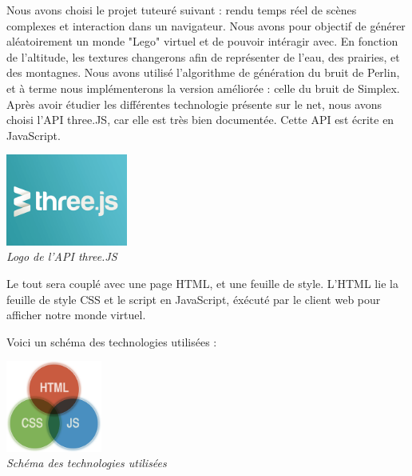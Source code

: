 Nous avons choisi le projet tuteuré suivant : rendu temps réel de scènes complexes et interaction dans un navigateur.
Nous avons pour objectif de générer aléatoirement un monde "Lego" virtuel et de pouvoir intéragir avec. En fonction de
l'altitude, les textures changerons afin de représenter de l'eau, des prairies, et des montagnes. Nous avons utilisé
l'algorithme de génération du bruit de Perlin, et à terme nous implémenterons la version améliorée : celle du bruit de Simplex.
Après avoir étudier les différentes technologie présente sur le net, nous avons choisi l'API three.JS, car elle est très bien
documentée. Cette API est écrite en JavaScript.

\begin{center}
	\null\vspace{0.25cm}
	\includegraphics[height=3cm]{images/logo_threeJS.png}\\
	\textit{Logo de l'API three.JS}\\
\end{center}

Le tout sera couplé avec une page HTML, et une feuille de style. L'HTML lie la feuille de style CSS et le script en JavaScript, éxécuté par le client web pour afficher notre monde virtuel.

Voici un schéma des technologies utilisées :

\begin{center}
	\null\vspace{0.25cm}
	\includegraphics[height=3cm]{images/HTML_CSS_JS.png}\\
	\textit{Schéma des technologies utilisées}\\
\end{center}

